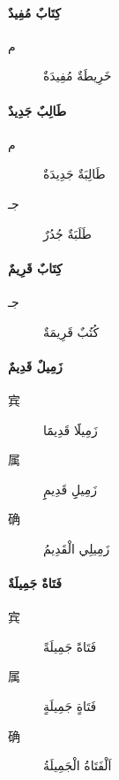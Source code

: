 \begin{Arabic}
    \paragraph{كِتَابٌ مُفِيدٌ}
    \begin{description}
        \item [م] خَرِيطَةٌ مُفِيدَةٌ
    \end{description}

    \paragraph{طَالِبٌ جَدِيدٌ}
    \begin{description}
        \item [م] طَالِبَةٌ جَدِيدَةٌ
        \item [جـ] طَلَبَةٌ جُدُرٌ
    \end{description}

    \paragraph{كِتَابٌ قَرِيمٌ}
    \begin{description}
        \item [جـ] كُتُبٌ قَرِيمَةٌ
    \end{description}

    \paragraph{زَمِيلٌ قَدِيمٌ}
    \begin{description}
        \item [宾] زَمِيلََا قَدِيمََا
        \item [属] زَمِيلِِ قَدِيمِِ
        \item [确] زَمِيلِي الْقَدِيمُ
    \end{description}

    \paragraph{فَتَاةٌ جَمِيلَةٌ}
    \begin{description}
        \item [宾] فَتَاةً جَمِيلَةً
        \item [属] فَتَاةٍ جَمِيلَةٍ
        \item [确] اَلْفَتَاةُ الْجَمِيلَةُ 
    \end{description}
\end{Arabic}


